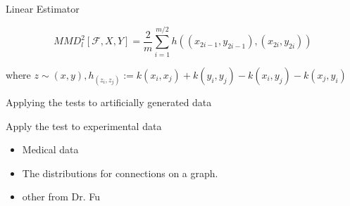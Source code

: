 \documentclass{beamer}
\newcommand{\bi}{\begin{itemize}}
\newcommand{\ei}{\end{itemize}}
\begin{document}
\begin{frame}
{Linear Estimator}

$$ {MMD}^2_l[\mathcal{F}, X, Y] = \frac 2m \sum_{i = 1}^{m/2} h((x_{2i -1}, y_{2i - 1}), (x_{2i}, y_{2i}))$$

where $z \sim (x,y), h_(z_i, z_j) := k(x_i, x_j) + k(y_i, y_j) - k(x_i, y_j) - k(x_j, y_i)$
\end{frame}
\begin{frame}{Applying the tests to artificially generated data}
 
\end{frame}

\begin{frame}{Apply the test to experimental data}
 
 \bi
 \item Medical data
 
 \item The distributions for connections on a graph.
 
 \item other from Dr. Fu
 \ei 
\end{frame}
\end{document}

